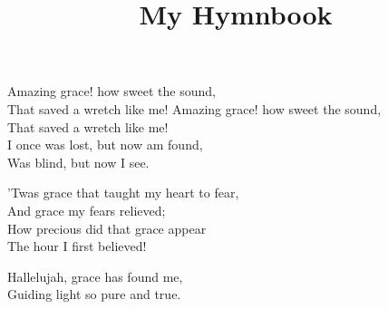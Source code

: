 \documentclass[12pt]{article}
\title{My Hymnbook}
\author{}
\date{}
\begin{document}
\maketitle
\tableofcontents
\newpage


\begin{stanza}
 Amazing grace! how sweet the sound,\\
That saved a wretch like me!
Amazing grace! how sweet the sound,\\
That saved a wretch like me!\\
I once was lost, but now am found,\\
Was blind, but now I see.
\end{stanza}

\begin{stanza}
’Twas grace that taught my heart to fear,\\
And grace my fears relieved;\\
How precious did that grace appear\\
The hour I first believed!
\end{stanza}

\begin{chorus}
Hallelujah, grace has found me,\\
Guiding light so pure and true.
\end{chorus}
\end{document}
